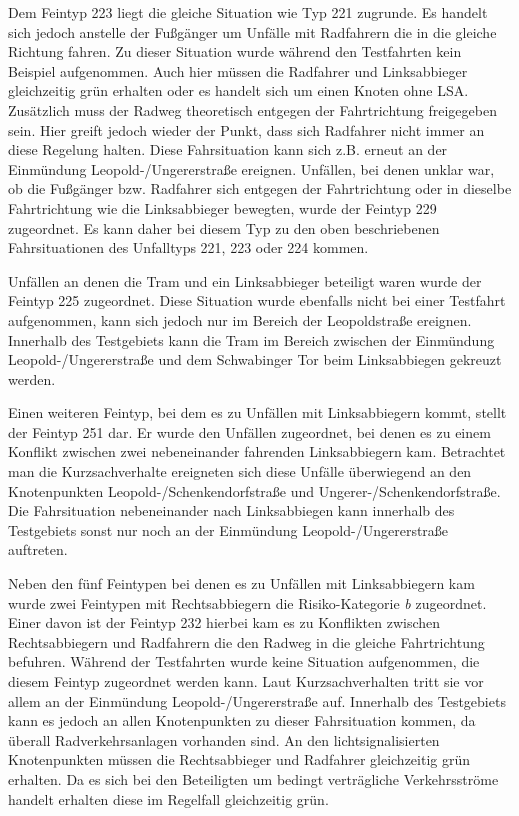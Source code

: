 Dem Feintyp 223 liegt die gleiche Situation wie Typ 221 zugrunde. Es handelt sich jedoch anstelle der Fußgänger um Unfälle mit Radfahrern die in die gleiche Richtung fahren. Zu dieser Situation wurde während den Testfahrten kein Beispiel aufgenommen. Auch hier müssen die Radfahrer und Linksabbieger gleichzeitig grün erhalten oder es handelt sich um einen Knoten ohne \ac{LSA}. Zusätzlich muss der Radweg theoretisch entgegen der Fahrtrichtung freigegeben sein. Hier greift jedoch wieder der Punkt, dass sich Radfahrer nicht immer an diese Regelung halten. Diese Fahrsituation kann sich z.B. erneut an der Einmündung Leopold-/Ungererstraße ereignen. Unfällen, bei denen unklar war, ob die Fußgänger bzw. Radfahrer sich entgegen der Fahrtrichtung oder in dieselbe Fahrtrichtung wie die Linksabbieger bewegten, wurde der Feintyp 229 zugeordnet. Es kann daher bei diesem Typ zu den oben beschriebenen Fahrsituationen des Unfalltyps 221, 223 oder 224 kommen.

Unfällen an denen die Tram und ein Linksabbieger beteiligt waren wurde der Feintyp 225 zugeordnet. Diese Situation wurde ebenfalls nicht bei einer Testfahrt aufgenommen, kann sich jedoch nur im Bereich der Leopoldstraße ereignen. Innerhalb des Testgebiets kann die Tram im Bereich zwischen der Einmündung Leopold-/Ungererstraße und dem Schwabinger Tor beim Linksabbiegen gekreuzt werden. 

Einen weiteren Feintyp, bei dem es zu Unfällen mit Linksabbiegern kommt, stellt der Feintyp 251 dar. Er wurde den Unfällen zugeordnet, bei denen es zu einem Konflikt zwischen zwei nebeneinander fahrenden Linksabbiegern kam. Betrachtet man die Kurzsachverhalte ereigneten sich diese Unfälle überwiegend an den Knotenpunkten Leopold-/Schenkendorfstraße und Ungerer-/Schenkendorfstraße. Die Fahrsituation nebeneinander nach Linksabbiegen kann innerhalb des Testgebiets sonst nur noch an der Einmündung Leopold-/Ungererstraße auftreten.

Neben den fünf Feintypen bei denen es zu Unfällen mit Linksabbiegern kam wurde zwei Feintypen mit Rechtsabbiegern die Risiko-Kategorie \textit{b} zugeordnet. Einer davon ist der Feintyp 232 hierbei kam es zu Konflikten zwischen Rechtsabbiegern und Radfahrern die den Radweg in die gleiche Fahrtrichtung befuhren. Während der Testfahrten wurde keine Situation aufgenommen, die diesem Feintyp zugeordnet werden kann. Laut Kurzsachverhalten tritt sie vor allem an der Einmündung Leopold-/Ungererstraße auf. Innerhalb des Testgebiets kann es jedoch an allen Knotenpunkten zu dieser Fahrsituation kommen, da überall Radverkehrsanlagen vorhanden sind. An den lichtsignalisierten Knotenpunkten müssen die Rechtsabbieger und Radfahrer gleichzeitig grün erhalten. Da es sich bei den Beteiligten um bedingt verträgliche Verkehrsströme handelt erhalten diese im Regelfall gleichzeitig grün.

